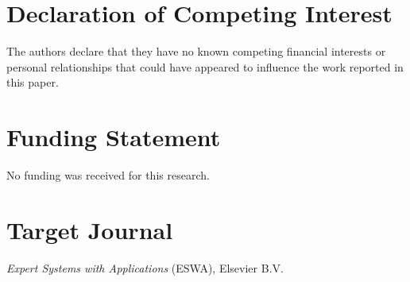 \documentclass[11pt,a4paper]{article}
\begin{document}
\vspace{1.5em}

\section*{Declaration of Competing Interest}
The authors declare that they have no known competing financial interests or personal relationships that could have appeared to influence the work reported in this paper.

\vspace{1.5em}

\section*{Funding Statement}
No funding was received for this research.

\vspace{1.5em}

\section*{Target Journal}
\textit{Expert Systems with Applications} (ESWA), Elsevier B.V.
\end{document}
